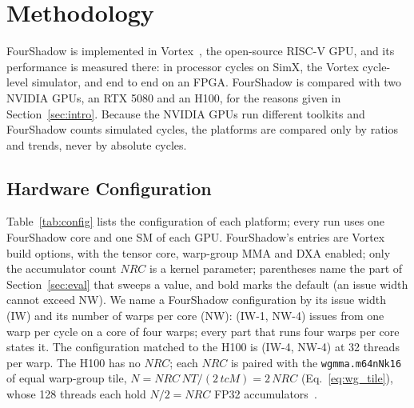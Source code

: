 \section{Methodology}
\label{sec:methodology}

FourShadow is implemented in Vortex~\cite{vortex}, the open-source RISC-V GPU, and its performance is measured there: in processor cycles on SimX, the Vortex cycle-level simulator, and end to end on an FPGA. FourShadow is compared with two NVIDIA GPUs, an RTX 5080 and an H100, for the reasons given in Section~\ref{sec:intro}. Because the NVIDIA GPUs run different toolkits and FourShadow counts simulated cycles, the platforms are compared only by ratios and trends, never by absolute cycles.

\subsection{Hardware Configuration}\label{sec:method_hw}

Table~\ref{tab:config} lists the configuration of each platform; every run uses one FourShadow core and one SM of each GPU. FourShadow's entries are Vortex build options, with the tensor core, warp-group MMA and DXA enabled; only the accumulator count $\mathit{NRC}$ is a kernel parameter; parentheses name the part of Section~\ref{sec:eval} that sweeps a value, and bold marks the default (an issue width cannot exceed NW). We name a FourShadow configuration by its issue width (IW) and its number of warps per core (NW): (IW-1, NW-4) issues from one warp per cycle on a core of four warps; every part that runs four warps per core states it. The configuration matched to the H100 is (IW-4, NW-4) at 32 threads per warp. The H100 has no $\mathit{NRC}$; each $\mathit{NRC}$ is paired with the \texttt{wgmma.m64nNk16} of equal warp-group tile, $N{=}\mathit{NRC}\,\mathit{NT}/(2\,\mathit{tcM}){=}2\,\mathit{NRC}$ (Eq.~\ref{eq:wg_tile}), whose 128 threads each hold $N/2{=}\mathit{NRC}$ FP32 accumulators~\cite{nvidia2026ptxisa}.

